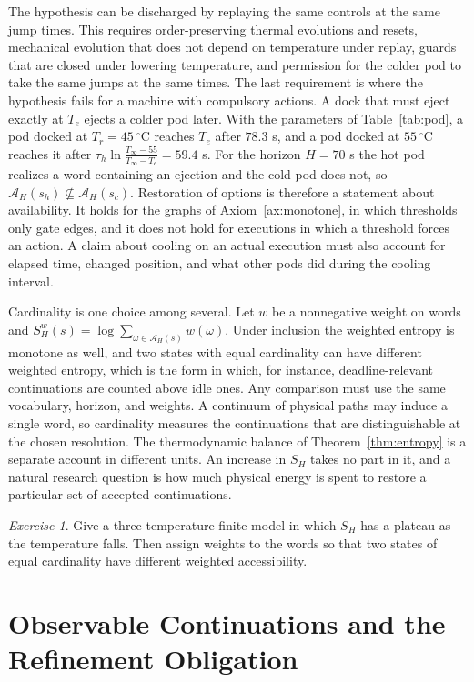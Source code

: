 \documentclass[11pt,openany]{book}
\theoremstyle{plain}
\theoremstyle{definition}
\theoremstyle{remark}
\newtheorem{exercise}[theorem]{Exercise}
\begin{document}
The hypothesis can be discharged by replaying the same controls at the same jump times. This requires order-preserving thermal evolutions and resets, mechanical evolution that does not depend on temperature under replay, guards that are closed under lowering temperature, and permission for the colder pod to take the same jumps at the same times. The last requirement is where the hypothesis fails for a machine with compulsory actions. A dock that must eject exactly at $T_e$ ejects a colder pod later. With the parameters of Table~\ref{tab:pod}, a pod docked at $T_r=45\ ^\circ$C reaches $T_e$ after $78.3$ s, and a pod docked at $55\ ^\circ$C reaches it after $\tau_h\ln\frac{T_\infty-55}{T_\infty-T_e}=59.4$ s. For the horizon $H=70$ s the hot pod realizes a word containing an ejection and the cold pod does not, so $\mathcal A_H(s_h)\not\subseteq\mathcal A_H(s_c)$. Restoration of options is therefore a statement about availability. It holds for the graphs of Axiom~\ref{ax:monotone}, in which thresholds only gate edges, and it does not hold for executions in which a threshold forces an action. A claim about cooling on an actual execution must also account for elapsed time, changed position, and what other pods did during the cooling interval.

Cardinality is one choice among several. Let $w$ be a nonnegative weight on words and $S_H^w(s)=\log\sum_{\omega\in\mathcal A_H(s)}w(\omega)$. Under inclusion the weighted entropy is monotone as well, and two states with equal cardinality can have different weighted entropy, which is the form in which, for instance, deadline-relevant continuations are counted above idle ones. Any comparison must use the same vocabulary, horizon, and weights. A continuum of physical paths may induce a single word, so cardinality measures the continuations that are distinguishable at the chosen resolution. The thermodynamic balance of Theorem~\ref{thm:entropy} is a separate account in different units. An increase in $S_H$ takes no part in it, and a natural research question is how much physical energy is spent to restore a particular set of accepted continuations.

\begin{exercise}
Give a three-temperature finite model in which $S_H$ has a plateau as the temperature falls. Then assign weights to the words so that two states of equal cardinality have different weighted accessibility.
\end{exercise}

\section{Observable Continuations and the Refinement Obligation}
\end{document}

